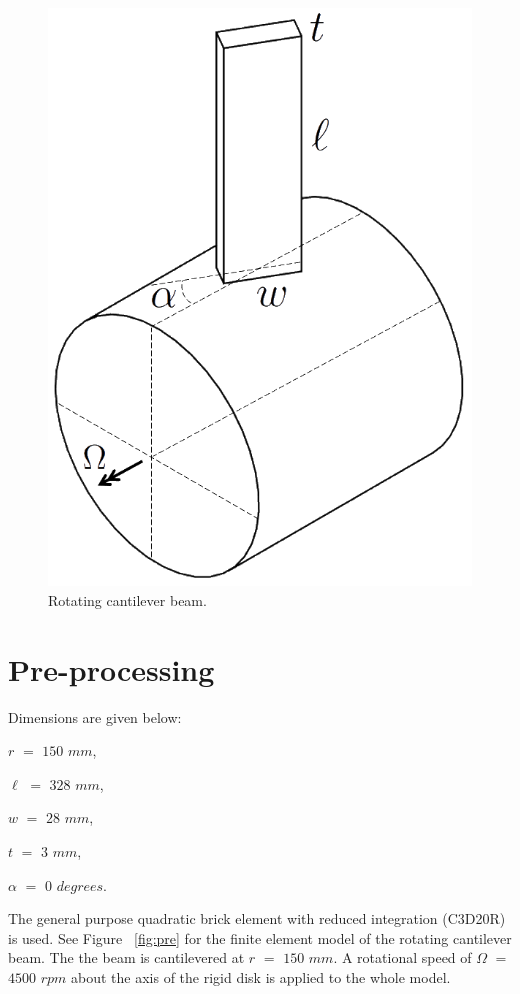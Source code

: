 \documentclass[12pt, a4paper, twoside]{article}
\begin{document}
\begin{figure}[h]
    \centering
    \includegraphics[scale=0.5]{rotating_cantilever_beam}
    \caption{Rotating cantilever beam.}
    \label{fig:rotating_cantilever_beam}
\end{figure}


\section{Pre-processing}
Dimensions are given below:

$r$ $=$ $150$ $mm$,

$\ell$ $=$ $328$ $mm$,

$w$ $=$ $28$ $mm$,

$t$ $=$ $3$ $mm$,

$\alpha$ $=$ $0$ $degrees$.

The general purpose quadratic brick element with reduced integration (C3D20R) is used. See Figure ~\ref{fig:pre} for the finite element model of the rotating cantilever beam. The the beam is cantilevered at $r$ $=$ $150$ $mm$. A rotational speed of $\Omega$ $=$ $4500$ $rpm$ about the axis of the rigid disk is applied to the whole model.
\end{document}
